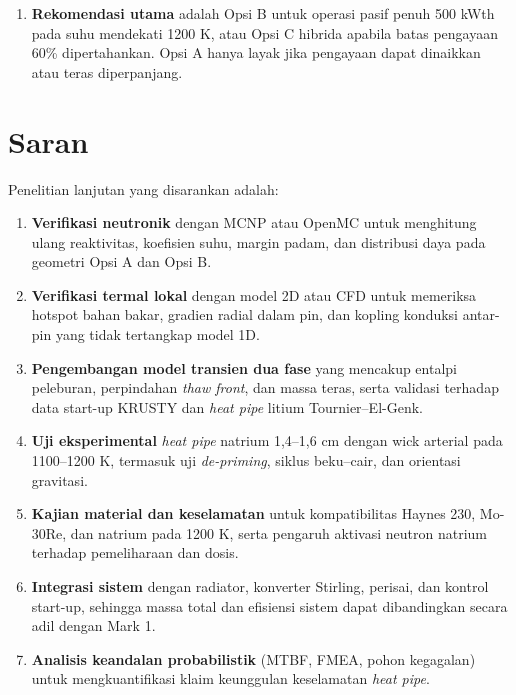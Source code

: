 \documentclass[
  indonesian,
  12pt,
  a4paper,
]{report}
\providecommand{\tightlist}{%
  \setlength{\itemsep}{0pt}\setlength{\parskip}{0pt}}
\begin{document}
\begin{enumerate}
{  tunggal kegagalan.} Sistem pompa Na-78K membutuhkan daya 286 W dan
  bermassa sekitar 120 kg. Sistem \emph{heat pipe} Opsi B bermassa 34,6
  kg, sehingga menghemat \textbf{85,4 kg (71\%)} massa subsistem
  pendingin. Setelah memperhitungkan pembesaran teras dan reflektor,
  massa total Opsi B naik 67,7 kg; namun pompa, pengontrol, dan manifold
  yang menjadi titik tunggal kegagalan berhasil dihilangkan, dan
  redundansi N\$- \$ 2 tersedia melalui 72 pipa independen.
\item
  \textbf{Rekomendasi utama} adalah Opsi B untuk operasi pasif penuh 500
  kWth pada suhu mendekati 1200 K, atau Opsi C hibrida apabila batas
  pengayaan 60\% dipertahankan. Opsi A hanya layak jika pengayaan dapat
  dinaikkan atau teras diperpanjang.
\end{enumerate}

\section{Saran}\label{saran}

Penelitian lanjutan yang disarankan adalah:

\begin{enumerate}
\def\labelenumi{\arabic{enumi}.}
\tightlist
\item
  \textbf{Verifikasi neutronik} dengan MCNP atau OpenMC untuk menghitung
  ulang reaktivitas, koefisien suhu, margin padam, dan distribusi daya
  pada geometri Opsi A dan Opsi B.
\item
  \textbf{Verifikasi termal lokal} dengan model 2D atau CFD untuk
  memeriksa hotspot bahan bakar, gradien radial dalam pin, dan kopling
  konduksi antar-pin yang tidak tertangkap model 1D.
\item
  \textbf{Pengembangan model transien dua fase} yang mencakup entalpi
  peleburan, perpindahan \emph{thaw front}, dan massa teras, serta
  validasi terhadap data start-up KRUSTY dan \emph{heat pipe} litium
  Tournier--El-Genk.
\item
  \textbf{Uji eksperimental} \emph{heat pipe} natrium 1,4--1,6 cm dengan
  wick arterial pada 1100--1200 K, termasuk uji \emph{de-priming},
  siklus beku--cair, dan orientasi gravitasi.
\item
  \textbf{Kajian material dan keselamatan} untuk kompatibilitas Haynes
  230, Mo-30Re, dan natrium pada 1200 K, serta pengaruh aktivasi neutron
  natrium terhadap pemeliharaan dan dosis.
\item
  \textbf{Integrasi sistem} dengan radiator, konverter Stirling,
  perisai, dan kontrol start-up, sehingga massa total dan efisiensi
  sistem dapat dibandingkan secara adil dengan Mark 1.
\item
  \textbf{Analisis keandalan probabilistik} (MTBF, FMEA, pohon
  kegagalan) untuk mengkuantifikasi klaim keunggulan keselamatan
  \emph{heat pipe}.
\end{enumerate}
\end{document}
